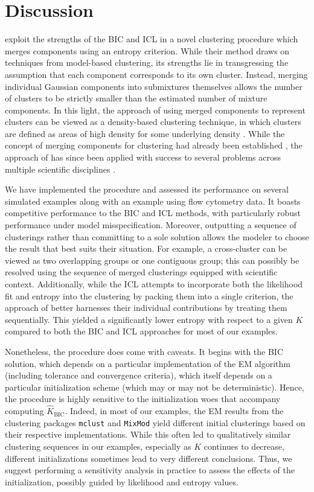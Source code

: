\documentclass{uwstat572}
\newcommand*\estim[1]{\widehat{#1}}
\renewcommand\;{\,}
\begin{document}
\section{Discussion}
\cite{Baudry10} exploit the strengths of the BIC and ICL in a novel clustering procedure which merges components using an entropy criterion.
While their method draws on techniques from model-based clustering, its strengths lie in transgressing the assumption that each component corresponds to its own cluster.
Instead, merging individual Gaussian components into submixtures themselves allows the number of clusters to be strictly smaller than the estimated number of mixture components.
In this light, the approach of using merged components to represent clusters can be viewed as a density-based clustering technique, in which clusters are defined as areas of high density for some underlying density \citep{Hans11}.
While the concept of merging components for clustering had already been established \citep{Hennig10}, the approach of \cite{Baudry10} has since been applied with success to several problems across multiple scientific disciplines \citep{Huang14, Ho12, Gormley11}. 

We have implemented the procedure and assessed its performance on several simulated examples along with an example using flow cytometry data.
It boasts competitive performance to the BIC and ICL methods, with particularly robust performance under model misspecification.
Moreover, outputting a sequence of clusterings rather than committing to a sole solution allows the modeler to choose the result that best suits their situation.
For example, a cross-cluster can be viewed as two overlapping groups or one contiguous group; this can possibly be resolved using the sequence of merged clusterings equipped with scientific context.
Additionally, while the ICL attempts to incorporate both the likelihood fit and entropy into the clustering by packing them into a single criterion, the approach of \cite{Baudry10} better harnesses their individual contributions by treating them sequentially.
This yielded a significantly lower entropy with respect to a given $K$ compared to both the BIC and ICL approaches for most of our examples.


Nonetheless, the procedure does come with caveats.
It begins with the BIC solution, which depends on a particular implementation of the EM algorithm (including tolerance and convergence criteria), which itself depends on a particular initialization scheme (which may or may not be deterministic).
Hence, the procedure is highly sensitive to the initialization woes that accompany computing $\estim K_\text{BIC}$.
Indeed, in most of our examples, the EM results from the clustering packages \texttt{mclust} and \texttt{MixMod} yield different initial clusterings based on their respective implementations.
While this often led to qualitatively similar clustering sequences in our examples, especially as $K$ continues to decrease, different initializations sometimes lead to very different conclusions.
Thus, we suggest performing a sensitivity analysis in practice to assess the effects of the initialization, possibly guided by likelihood and entropy values.
\end{document}
